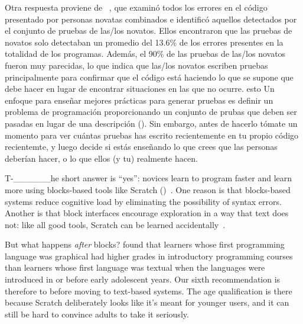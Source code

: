 Otra respuesta proviene de ~\cite{Edwa2014b},
que examinó todos los errores en el código presentado por personas novatas combinados
e identificó aquellos detectados por el conjunto de pruebas de las/los novatos.
Ellos encontraron que las pruebas de novatos solo detectaban un promedio del 13.6\% de los errores presentes en la totalidad de los programas.
Además,
el 90\% de las pruebas de las/los novatos fueron muy parecidas,
lo que indica que las/los novatos escriben pruebas principalmente para confirmar que el código está haciendo lo que se supone que debe hacer
en lugar de encontrar situaciones en las que no ocurre.
esto
Un enfoque para enseñar mejores prácticas para generar pruebas es 
definir un problema de programación proporcionando un conjunto de prubas que deben ser pasadas
en lugar de una descripción ().
Sin embargo,
antes de hacerlo 
tómate un momento para ver cuántas pruebas has escrito recientemente en tu propio código recientemte,
y luego decide si estás enseñando lo que crees que las personas deberían hacer,
 o lo que ellos (y tu) realmente hacen.


T-______he short answer is ``yes'':
novices learn to program faster and learn more
using blocks-based tools like Scratch ()~\cite{Wein2017}.
One reason is that blocks-based systems reduce cognitive load by eliminating the possibility of syntax errors.
Another is that block interfaces encourage exploration in a way that text does not:
like all good tools,
Scratch can be learned accidentally~\cite{Malo2010}.

But what happens \emph{after} blocks?
\cite{Chen2018} found that learners whose first programming language was graphical
had higher grades in introductory programming courses
than learners whose first language was textual
when the languages were introduced in or before early adolescent years.
Our sixth recommendation is therefore to
before moving to text-based systems.
The age qualification is there because Scratch deliberately looks like it's meant for younger users,
and it can still be hard to convince adults to take it seriously.



